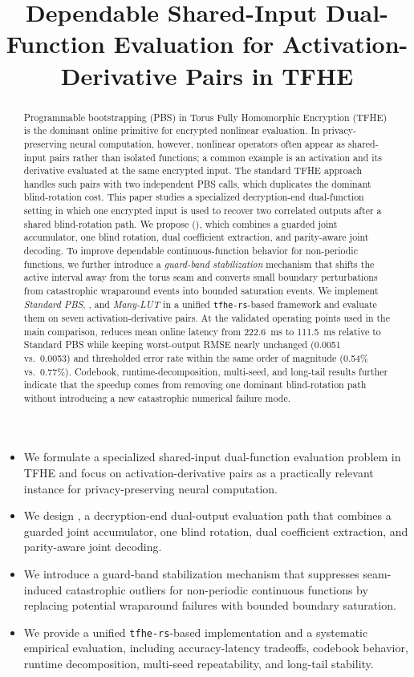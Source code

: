 \title{Dependable Shared-Input Dual-Function Evaluation for Activation-Derivative Pairs in TFHE}

\begin{abstract}
Programmable bootstrapping (PBS) in Torus Fully Homomorphic Encryption (TFHE) is the dominant online primitive for encrypted nonlinear evaluation. In privacy-preserving neural computation, however, nonlinear operators often appear as shared-input pairs rather than isolated functions; a common example is an activation and its derivative evaluated at the same encrypted input. The standard TFHE approach handles such pairs with two independent PBS calls, which duplicates the dominant blind-rotation cost. This paper studies a specialized decryption-end dual-function setting in which one encrypted input is used to recover two correlated outputs after a shared blind-rotation path. We propose \emph{\SDRPBSfull} (\emph{\SDRPBS}), which combines a guarded joint accumulator, one blind rotation, dual coefficient extraction, and parity-aware joint decoding. To improve dependable continuous-function behavior for non-periodic functions, we further introduce a \emph{guard-band stabilization} mechanism that shifts the active interval away from the torus seam and converts small boundary perturbations from catastrophic wraparound events into bounded saturation events. We implement \emph{Standard PBS}, \emph{\SDRPBS}, and \emph{Many-LUT} in a unified \texttt{tfhe-rs}-based framework and evaluate them on seven activation-derivative pairs. At the validated operating points used in the main comparison, \SDRPBS reduces mean online latency from 222.6~ms to 111.5~ms relative to Standard PBS while keeping worst-output RMSE nearly unchanged (0.0051 vs.\ 0.0053) and thresholded error rate within the same order of magnitude (0.54\% vs.\ 0.77\%). Codebook, runtime-decomposition, multi-seed, and long-tail results further indicate that the speedup comes from removing one dominant blind-rotation path without introducing a new catastrophic numerical failure mode.
\end{abstract}

\begin{itemize}
\item We formulate a specialized shared-input dual-function evaluation problem in TFHE and focus on activation-derivative pairs as a practically relevant instance for privacy-preserving neural computation.
\item We design \emph{\SDRPBS}, a decryption-end dual-output evaluation path that combines a guarded joint accumulator, one blind rotation, dual coefficient extraction, and parity-aware joint decoding.
\item We introduce a guard-band stabilization mechanism that suppresses seam-induced catastrophic outliers for non-periodic continuous functions by replacing potential wraparound failures with bounded boundary saturation.
\item We provide a unified \texttt{tfhe-rs}-based implementation and a systematic empirical evaluation, including accuracy-latency tradeoffs, codebook behavior, runtime decomposition, multi-seed repeatability, and long-tail stability.
\end{itemize}

